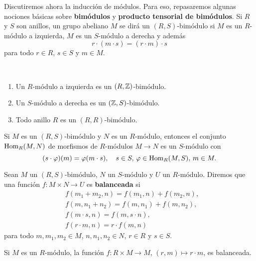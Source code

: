 Discutiremos ahora la inducción de módulos. Para eso, repasaremos algunas nociones básicas sobre
\textbf{bimódulos} y \textbf{producto tensorial de bimódulos}. 
Si $R$ y $S$ son anillos, un grupo abeliano $M$ se dirá un $(R,S)$-bimódulo si 
$M$ es un $R$-módulo a izquierda, $M$ es un $S$-módulo a derecha y además
\[
r\cdot (m\cdot s)=(r\cdot m)\cdot s
\]
para todo $r\in R$, $s\in S$ y $m\in M$. 

\begin{examples}\
\begin{enumerate}
    \item Un $R$-módulo a izquierda es un $(R,\mathbb{Z})$-bimódulo.
    \item Un $S$-módulo a derecha es un $(\mathbb{Z},S)$-bimódulo.
    \item Todo anillo $R$ es un $(R,R)$-bimódulo.
\end{enumerate}
\end{examples}

\begin{example}
Si $M$ es un $(R,S)$-bimódulo y $N$ es un $R$-módulo, entonces el conjunto 
$\operatorname{Hom}_R(M,N)$ de morfismos de $R$-módulos $M\to N$ es un 
$S$-módulo con 
\[
(s\cdot \varphi)(m)=\varphi(m\cdot s),\quad s\in S,\,\varphi\in\operatorname{Hom}_R(M,S),\,m\in M.
\]
\end{example}

Sean $M$ un $(R,S)$-bimódulo, $N$ un $S$-módulo y $U$ un $R$-módulo. 
Diremos que una función $f\colon M\times N\to U$ 
es \textbf{balanceada} si 
\begin{align*}
    &f(m_1+m_2,n)=f(m_1,n)+f(m_2,n),\\
    &f(m,n_1+n_2)=f(m,n_1)+f(m,n_2),\\
    &f(m\cdot s,n)=f(m,s\cdot n),\\
    &f(r\cdot m,n)=r\cdot f(m,n)
\end{align*}
para todo $m,m_1,m_2\in M$, $n,n_1,n_2\in N$, $r\in R$ y $s\in S$. 

\begin{example}
Si $M$ es un $R$-módulo, la función $f\colon R\times M\to M$, $(r,m)\mapsto r\cdot m$, es balanceada. 
\end{example}

